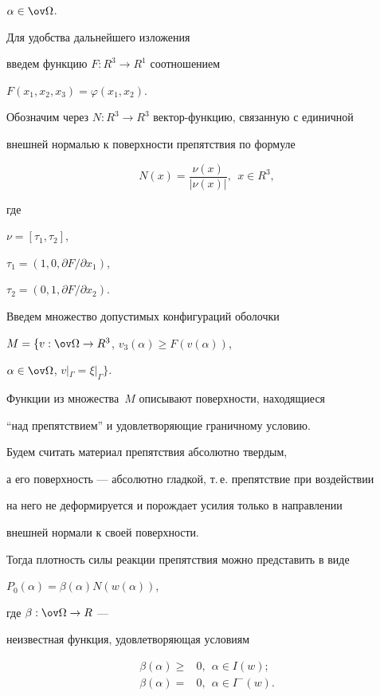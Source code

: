 $\alpha \in \ov\Omega$.


Для удобства дальнейшего изложения


введем функцию $F:R^3 \to R^1$ соотношением


$F(x_1, x_2,x_3)=\varphi (x_1,x_2)$.


Обозначим через $N:R^3 \to R^3$ вектор-функцию, связанную с единичной


внешней нормалью к поверхности препятствия по формуле 


\begin{equation} 


N(x)=\frac {\nu (x)} {|\nu (x)|},\ \ x \in R^3,


\label{Opr_N}


\end{equation}


где


$\nu=[\tau_1,\tau_2]$, 


$\tau_1=( 1,0,{\partial F}/{\partial x_1} )$,


$\tau_2=( 0,1,{\partial F}/{\partial x_2} )$.


Введем множество допустимых конфигураций оболочки


$M=\{v : \ov\Omega \to R^3$, $v_3(\alpha ) \geq F(v(\alpha ))$,


$\alpha \in \ov\Omega$, ${v} |_\Gamma={\xi} |_\Gamma\}$.


Функции из множества~$M$ описывают поверхности, находящиеся 


``над препятствием'' и удовлетворяющие граничному условию.





Будем считать материал препятствия абсолютно твердым,


а его поверхность --- абсолютно гладкой, т.\,е. препятствие при воздействии


на него не деформируется и порождает усилия только в направлении 


внешней нормали к своей поверхности.


Тогда плотность силы реакции препятствия можно представить в виде 


$P_0(\alpha )=\beta(\alpha ) N(w(\alpha ))$,


где $\beta : \ov\Omega \to R $ --- 


неизвестная функция, удовлетворяющая условиям


\begin{align} 


\beta(\alpha ) \geq &0,\ \ \alpha \in I(w); 


\label{beta_1} \\


%


\beta(\alpha )=&0,\ \  \alpha \in I^{-}(w).


\label{beta_2}


\end{align}


